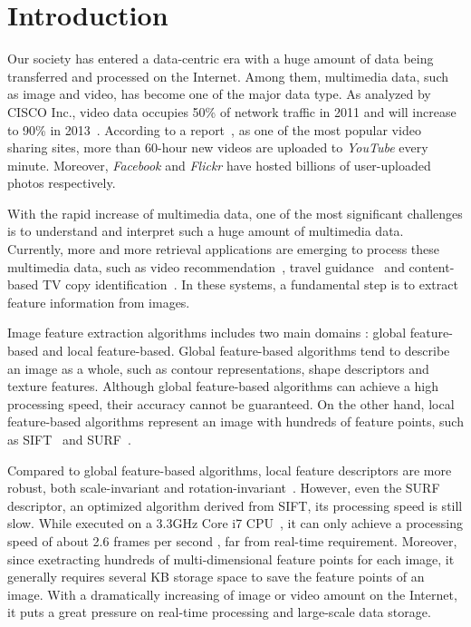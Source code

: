 \section{Introduction}
\label{sec:introduction}

Our society has entered a data-centric era with a huge amount of data being transferred and processed on the Internet. Among them, multimedia data, such as image and video, has become one of the major data type. As analyzed by CISCO Inc., video data occupies 50\% of network traffic in 2011 and will increase to 90\% in 2013~\cite{index2010forecast}.  According to a report~\cite{jansohn2009detecting}, as one of the most popular video sharing sites, more than 60-hour new videos are uploaded to \emph{YouTube} every minute. Moreover, \emph{Facebook} and \emph{Flickr} have hosted billions of user-uploaded photos respectively.

With the rapid increase of multimedia data, one of the most significant challenges is to understand and interpret such a huge amount of multimedia data. Currently, more and more retrieval applications are emerging to process these multimedia data, such as video recommendation~\cite{videorecommendation2007}, travel guidance~\cite{travelguidance2010} and content-based TV copy identification~\cite{tvidentify2003}. In these systems, a fundamental step is to extract feature information from images. 

Image feature extraction algorithms includes two main domains : global feature-based and local feature-based. Global feature-based algorithms tend to describe an image as a whole, such as contour representations, shape descriptors and texture features. Although global feature-based algorithms can achieve a high processing speed, their accuracy cannot be guaranteed. On the other hand, local feature-based algorithms represent  an image with hundreds of feature points, such as SIFT~\cite{Lowe2004SIFT,RobHess} and SURF~\cite{Bay2006SURF,Evans20009OpenSURF}. 

Compared to global feature-based algorithms, local feature descriptors are more robust, both scale-invariant and rotation-invariant~\cite{mikolajczyk2005performance}\cite{Bauer2007Evaluation}. However, even the SURF descriptor, an optimized algorithm derived from SIFT, its processing speed is still slow. While executed on a 3.3GHz Core i7 CPU~\cite{Fang2011ispass}, it can only achieve a processing speed of  about 2.6 frames per second , far from real-time requirement. Moreover, since exetracting hundreds of multi-dimensional feature points for each image, it generally requires several KB storage space to save the feature points of an image. With a dramatically increasing of image or video amount on the Internet, it puts a great pressure on real-time processing and large-scale data storage.

